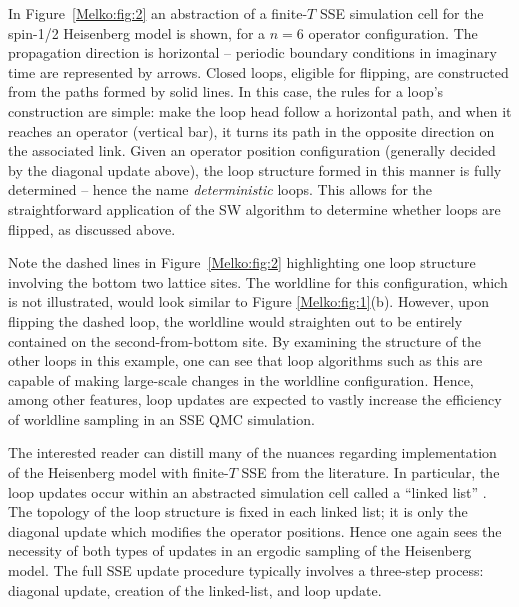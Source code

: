 \documentclass[vecphys]{svmult}
\begin{document}
In Figure~\ref{Melko:fig:2} an abstraction of a finite-$T$ SSE simulation cell for the spin-1/2 Heisenberg model is shown, for a $n=6$ operator configuration.  The propagation direction is horizontal -- periodic boundary conditions in imaginary time are represented by arrows.  Closed loops, eligible for flipping, are constructed from the  paths formed by solid lines.  In this case, the rules for a loop's construction are simple: make the loop head follow a horizontal path, and when it reaches an operator (vertical bar), it turns its path in the opposite direction on the associated link.  Given an operator position configuration (generally decided by the diagonal update above), the loop structure formed in this manner is fully determined -- hence the name {\it deterministic} loops.  
This allows for the straightforward application of the SW algorithm to determine whether loops are flipped, as discussed above.

Note the dashed lines in Figure~\ref{Melko:fig:2} highlighting one loop structure involving the bottom two lattice sites.  The worldline for this configuration, which is not illustrated, would look similar to Figure \ref{Melko:fig:1}(b).  However, upon flipping the dashed loop, the worldline would straighten out to be entirely contained on the second-from-bottom site.  By examining the structure of the other loops in this example, one can see that loop algorithms such as this are capable of making large-scale changes in the worldline configuration.  Hence, among other features, loop updates are expected to vastly increase the efficiency of worldline sampling in an SSE QMC simulation.

The interested reader can distill many of the nuances regarding implementation of the Heisenberg model with finite-$T$ SSE from the literature.    In particular, the loop updates occur within an abstracted simulation cell called a ``linked list'' \cite{Melko:Syljuasen02}.  The topology of the loop structure is fixed in each linked list; it is only the diagonal update which modifies the operator positions.  Hence one again sees the necessity of both types of updates in an ergodic sampling of the Heisenberg model.  The full SSE update procedure typically involves a three-step process: diagonal update, creation of the linked-list, and loop update.  
\end{document}
